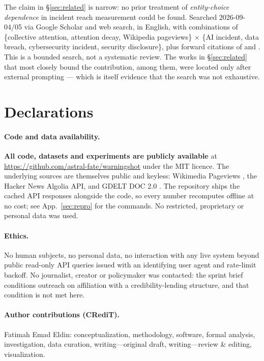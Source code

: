 \documentclass[11pt,a4paper]{article}
\begin{document}
The claim in §\ref{sec:related} is narrow: no prior treatment of
\emph{entity-choice dependence} in incident reach measurement could be found.
Searched 2026-09-04/05 via Google Scholar and web search, in English, with
combinations of \{collective attention, attention decay, Wikipedia pageviews\}
$\times$ \{AI incident, data breach, cybersecurity incident, security
disclosure\}, plus forward citations of \cite{garciagavilanes2016crashes} and
\cite{igarashi2022twophase}. This is a bounded search, not a systematic review.
The works in §\ref{sec:related} that most closely bound the contribution,
\cite{cavusoglu2004breach} among them, were located only after external
prompting --- which is itself evidence that the search was not exhaustive.

\section{Declarations}

\paragraph{Code and data availability.} \textbf{All code, datasets and
experiments are publicly available} at \url{https://github.com/astral-fate/warningshot} under the MIT licence. The
underlying sources are themselves public and keyless: Wikimedia Pageviews
\cite{wikimedia2026pageviews}, the Hacker News Algolia API, and GDELT DOC 2.0
\cite{gdelt2026doc}. The repository ships the cached API responses alongside the
code, so every number recomputes offline at no cost; see
App.~\ref{sec:repro} for the commands. No restricted, proprietary or personal
data was used.

\paragraph{Ethics.} No human subjects, no personal data, no interaction with any
live system beyond public read-only API queries issued with an identifying user
agent and rate-limit backoff. No journalist, creator or policymaker was
contacted: the sprint brief conditions outreach on affiliation with a
credibility-lending structure, and that condition is not met here.

\paragraph{Author contributions (CRediT).} Fatimah Emad Eldin:
conceptualization, methodology, software, formal analysis, investigation, data
curation, writing---original draft, writing---review \& editing, visualization.
\end{document}
